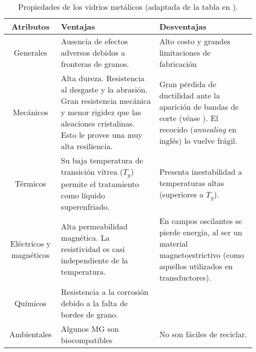 \begin{table}[htp]
\begin{center}
\begin{tabular}{c C{5cm} C{5cm}}
\hline
\textbf{Atributos} & \textbf{Ventajas} & \textbf{Desventajas} \\ \hline
 \hline

Generales &
Ausencia de efectos adversos debidos a fronteras de granos. &
Alto costo y grandes limitaciones de fabricación \\ \hline
 
Mecánicos &
Alta dureza. Resistencia al desgaste y la abrasión. Gran resistencia mecánica y menor rigidez que las aleaciones cristalinas. Esto le provee una muy alta resiliencia. & 
Gran pérdida de ductilidad ante la aparición de bandas de corte (véase ). El recocido (\textit{annealing} en inglés) lo vuelve frágil. \\ \hline 
 
Térmicos & 
Su baja temperatura de transición vítrea ($T_g$) permite el tratamiento como líquido superenfriado. & 
Presenta inestabilidad a temperaturas altas (superiores a $T_g$). \\ \hline

Eléctricos y magnéticos & 
Alta permeabilidad magnética. La resistividad es casi independiente de la temperatura.& 
En campos oscilantes se pierde energía, al ser un material magnetoestrictivo (como aquellos utilizados en transductores).\\ \hline

Químicos & 
Resistencia a la corrosión debido a la falta de bordes de grano.& \\ \hline

Ambientales & 
Algunos MG son biocompatibles & No son fáciles de reciclar. \\ \hline

\end{tabular}
\end{center}
\caption[Propiedades de los vidrios metálicos]{Propiedades de los vidrios metálicos (adaptada de la tabla en \cite{ashby06}).}
\label{C1:tbl:props}
\end{table}

